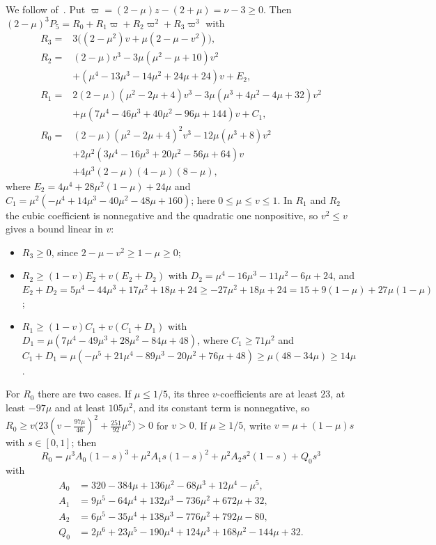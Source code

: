  We follow  of~\cite{Notes}. Put
$\varpi=(2-\mu)z-(2+\mu)=\nu-3\ge0$. Then
$(2-\mu)^3P_5=R_0+R_1\varpi+R_2\varpi^2+R_3\varpi^3$ with
\begin{align*}
R_3={}&3\bigl((2-\mu^2)v+\mu(2-\mu-v^2)\bigr),\\
R_2={}&(2-\mu)v^3-3\mu(\mu^2-\mu+10)v^2\\
 &+(\mu^4-13\mu^3-14\mu^2+24\mu+24)v+E_2,\\
R_1={}&2(2-\mu)(\mu^2-2\mu+4)v^3-3\mu(\mu^3+4\mu^2-4\mu+32)v^2\\
 &+\mu(7\mu^4-46\mu^3+40\mu^2-96\mu+144)v+C_1,\\
R_0={}&(2-\mu)(\mu^2-2\mu+4)^2v^3-12\mu(\mu^3+8)v^2\\
 &+2\mu^2(3\mu^4-16\mu^3+20\mu^2-56\mu+64)v\\
 &+4\mu^3(2-\mu)(4-\mu)(8-\mu),
\end{align*}
where $E_2=4\mu^4+28\mu^2(1-\mu)+24\mu$ and $C_1=\mu^2(-\mu^4+14\mu^3-40\mu^2-48\mu+160)$; here
$0\le\mu\le v\le1$. In $R_1$ and $R_2$ the cubic coefficient is nonnegative and the quadratic one
nonpositive, so $v^2\le v$ gives a bound linear in $v$:
\begin{itemize}
\item $R_3\ge0$, since $2-\mu-v^2\ge1-\mu\ge0$;
\item $R_2\ge(1-v)E_2+v(E_2+D_2)$ with $D_2=\mu^4-16\mu^3-11\mu^2-6\mu+24$, and
  $E_2+D_2=5\mu^4-44\mu^3+17\mu^2+18\mu+24\ge-27\mu^2+18\mu+24=15+9(1-\mu)+27\mu(1-\mu)$;
\item $R_1\ge(1-v)C_1+v(C_1+D_1)$ with $D_1=\mu(7\mu^4-49\mu^3+28\mu^2-84\mu+48)$, where
  $C_1\ge71\mu^2$ and $C_1+D_1=\mu(-\mu^5+21\mu^4-89\mu^3-20\mu^2+76\mu+48)\ge\mu(48-34\mu)
  \ge14\mu$.
\end{itemize}
For $R_0$ there are two cases. If $\mu\le1/5$, its three $v$-coefficients are at least $23$,
at least $-97\mu$ and at least $105\mu^2$, and its constant term is nonnegative, so
$R_0\ge v\bigl(23(v-\frac{97\mu}{46})^2+\frac{251}{92}\mu^2\bigr)>0$ for $v>0$. If $\mu\ge1/5$,
write $v=\mu+(1-\mu)s$ with $s\in[0,1]$; then
\[
R_0=\mu^3A_0(1-s)^3+\mu^2A_1s(1-s)^2+\mu^2A_2s^2(1-s)+Q_0s^3
\]
with
\begin{align*}
A_0&=320-384\mu+136\mu^2-68\mu^3+12\mu^4-\mu^5,\\
A_1&=9\mu^5-64\mu^4+132\mu^3-736\mu^2+672\mu+32,\\
A_2&=6\mu^5-35\mu^4+138\mu^3-776\mu^2+792\mu-80,\\
Q_0&=2\mu^6+23\mu^5-190\mu^4+124\mu^3+168\mu^2-144\mu+32 .
\end{align*}
